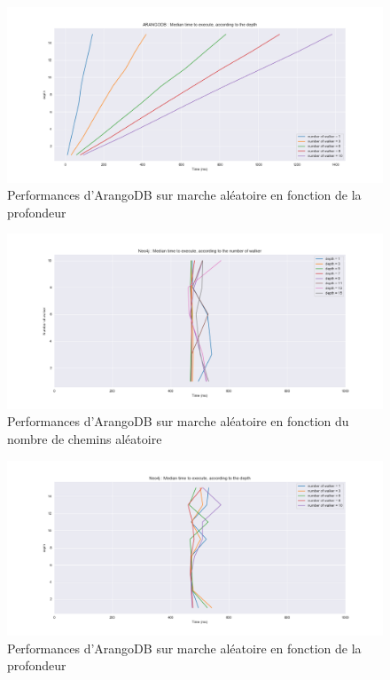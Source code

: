 \documentclass{article} %
\begin{document}
{\begin{figure}[!h]
 \centering
 \includegraphics[keepaspectratio = true,scale=0.4]{arangoDB_depth_time.png}
 \caption{Performances d'ArangoDB sur marche aléatoire en fonction de la profondeur}
 \label{fig:ardepth}
\end{figure}
\newpage

\begin{figure}[!h]
 \centering
 \includegraphics[keepaspectratio = true,scale=0.4]{neo4j_nbwalker_time.png}
 \caption{Performances d'ArangoDB sur marche aléatoire en fonction du nombre de chemins aléatoire}
 \label{fig:newalk}
\end{figure}


\begin{figure}[!h]
 \centering
 \includegraphics[keepaspectratio = true,scale=0.4]{neo4j_depth_time.png}
 \caption{Performances d'ArangoDB sur marche aléatoire en fonction de la profondeur}
 \label{fig:nedepth}
\end{figure}
\newpage
}
\end{document}
